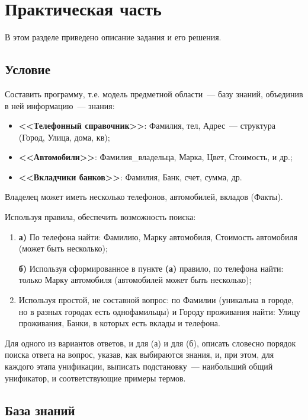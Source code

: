 \chapter{Практическая часть}
В этом разделе приведено описание задания и его решения.

\section{Условие}
Составить программу, т.е. модель предметной области~--- базу знаний, объединив в ней информацию~--- знания:
\begin{itemize}
    \item \textbf{<<Телефонный справочник>>}: Фамилия, \textnumero{}тел, Адрес~--- структура (Город, Улица, \textnumero{}дома, \textnumero{}кв);
    \item \textbf{<<Автомобили>>}:  Фамилия\_владельца, Марка, Цвет, Стоимость, и др.;
    \item \textbf{<<Вкладчики банков>>}: Фамилия, Банк, счет, сумма, др.
\end{itemize}
Владелец может иметь несколько телефонов, автомобилей, вкладов (Факты).

Используя правила, обеспечить возможность поиска:
\begin{enumerate}
    \item \textbf{а)} По \textnumero{} телефона найти: Фамилию, Марку автомобиля, Стоимость автомобиля (может быть несколько);

        \textbf{б)} Используя сформированное в пункте \textbf{(а)} правило, по \textnumero{} телефона найти: только Марку автомобиля (автомобилей может быть несколько);

    \item Используя простой, не составной вопрос: по Фамилии (уникальна в городе, но в разных городах есть однофамильцы) и Городу проживания найти: Улицу проживания, Банки, в которых есть вклады и \textnumero{} телефона.
\end{enumerate}

Для одного из вариантов ответов, и для (а) и для (б), описать словесно порядок поиска ответа на вопрос, указав, как выбираются знания, и, при этом, для каждого этапа унификации, выписать подстановку~--- наибольший общий унификатор, и соответствующие примеры термов.

\section{База знаний}

